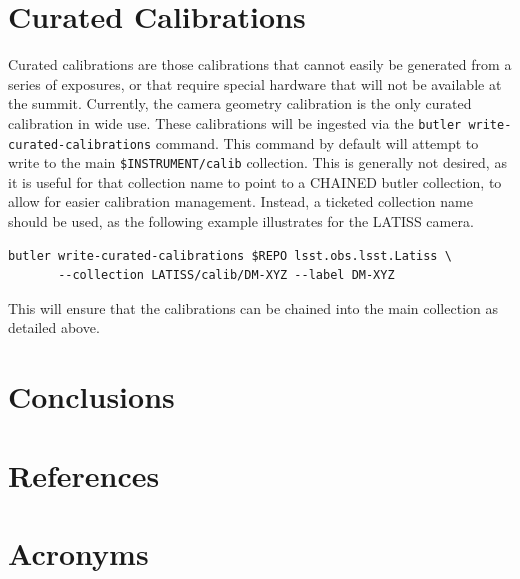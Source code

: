\documentclass[DM,authoryear,toc]{lsstdoc}
\begin{document}
\section{Curated Calibrations}

Curated calibrations are those calibrations that cannot easily be generated from a series of exposures, or that require special hardware that will not be available at the summit.  Currently, the camera geometry calibration is the only curated calibration in wide use.   These calibrations will be ingested via the \verb|butler write-curated-calibrations| command.  This command by default will attempt to write to the main \verb|$INSTRUMENT/calib| collection.  This is generally not desired, as it is useful for that collection name to point to a CHAINED butler collection, to allow for easier calibration management.  Instead, a ticketed collection name should be used, as the following example illustrates for the LATISS camera.

\begin{verbatim}
butler write-curated-calibrations $REPO lsst.obs.lsst.Latiss \
       --collection LATISS/calib/DM-XYZ --label DM-XYZ
\end{verbatim}

This will ensure that the calibrations can be chained into the main collection as detailed above.


\section{Conclusions}

\appendix
\section{References} \label{sec:bib}
\renewcommand{\refname}{} %


\section{Acronyms} \label{sec:acronyms}

\end{document}
